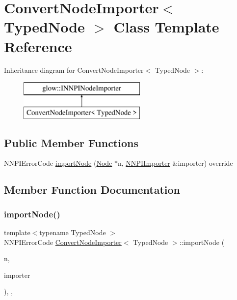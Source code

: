 \hypertarget{class_convert_node_importer}{}\section{Convert\+Node\+Importer$<$ Typed\+Node $>$ Class Template Reference}
\label{class_convert_node_importer}
Inheritance diagram for Convert\+Node\+Importer$<$ Typed\+Node $>$\+:\begin{figure}[H]
\begin{center}
\leavevmode
\includegraphics[height=2.000000cm]{class_convert_node_importer}
\end{center}
\end{figure}
\subsection*{Public Member Functions}
\begin{DoxyCompactItemize}
\item 
N\+N\+P\+I\+Error\+Code \hyperlink{class_convert_node_importer_ab28c71d682d465e178a4ccc862b570a3}{import\+Node} (\hyperlink{classglow_1_1_node}{Node} $\ast$n, \hyperlink{classglow_1_1_n_n_p_i_importer}{N\+N\+P\+I\+Importer} \&importer) override
\end{DoxyCompactItemize}


\subsection{Member Function Documentation}
\mbox{\label{class_convert_node_importer_ab28c71d682d465e178a4ccc862b570a3}} 
\subsubsection{\texorpdfstring{import\+Node()}{importNode()}}
{\footnotesize\ttfamily template$<$typename Typed\+Node $>$ \\
N\+N\+P\+I\+Error\+Code \hyperlink{class_convert_node_importer}{Convert\+Node\+Importer}$<$ Typed\+Node $>$\+::import\+Node (\begin{DoxyParamCaption}\item[{\hyperlink{classglow_1_1_node}{Node} $\ast$}]{n,  }\item[{\hyperlink{classglow_1_1_n_n_p_i_importer}{N\+N\+P\+I\+Importer} \&}]{importer }\end{DoxyParamCaption})\hspace{0.3cm}{\ttfamily [inline]}, {\ttfamily [override]}, {\ttfamily [virtual]}}

